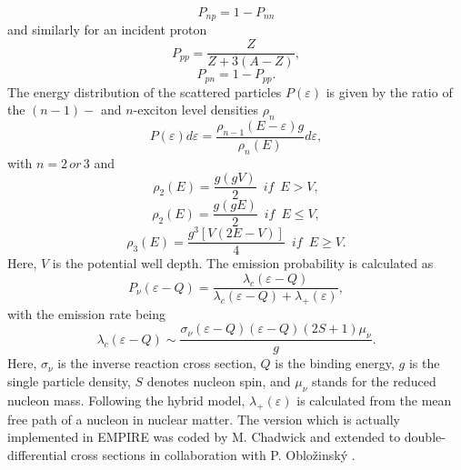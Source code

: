 \begin{equation}
P_{np}=1-P_{nn}  \label{Pnp}
\end{equation}
and similarly for an incident proton
\begin{equation}
P_{pp}=\frac{Z}{Z+3(A-Z)},  \label{Ppp}
\end{equation}
\begin{equation}
P_{pn}=1-P_{pp}.  \label{Ppn}
\end{equation}
The energy distribution of the scattered particles $P(\varepsilon)$ is given
by the ratio of the $(n-1)-$ and $n$-exciton level densities%
 $\rho_{n}$
\begin{equation}
P(\varepsilon)d\varepsilon=%
\frac{\rho_{n-1}(E-\varepsilon)g}{\rho_{n}(E)}d\varepsilon,  \label{Penergy}
\end{equation}
with $n=2\, or\,3$ and%
\begin{equation}
\rho_{2}(E)=\frac{g(gV)}{2}\,\,\, if\,\,\, E>V,  \label{ro2u}
\end{equation}
\begin{equation}
\rho_{2}(E)=\frac{g(gE)}{2}\,\,\, if\,\,\, E\leq V,  \label{ro2d}
\end{equation}
\begin{equation}
\rho_{3}(E)=\frac{g^{3}\left[V(2E-V)\right]}{4}\,\,\, if\,\,\, E\geq V.
\label{ro3}
\end{equation}
Here, $V$ is the potential well depth. The emission probability is calculated
as
\begin{equation}
P_{\nu}(\varepsilon-Q)=\frac{\lambda_{c}(\varepsilon-Q)}{\lambda_{c}(%
\varepsilon-Q)+\lambda_{+}(\varepsilon)},  \label{Pnu}
\end{equation}
with the emission rate being
\begin{equation}
\lambda_{c}(\varepsilon-Q)\sim\frac{\sigma_{\nu}(\varepsilon-Q)(%
\varepsilon-Q)(2S+1)\mu_{\nu}}{g}.  \label{lambdac}
\end{equation}
Here, $\sigma_{\nu}$ is the inverse reaction cross section, $Q$ is the binding
energy, $g$ is the single particle density, $S$ denotes nucleon spin, and $%
\mu_{\nu}$ stands for the reduced nucleon mass. Following the hybrid%
 model, $\lambda_{+}(\varepsilon)$ is calculated from the mean
free path of a nucleon in nuclear matter. The version which is actually
implemented in EMPIRE was coded by M. Chadwick and extended to
double-differential cross sections in collaboration with P. Oblo\v zinsk\' y
\cite{DDHMScode}.

